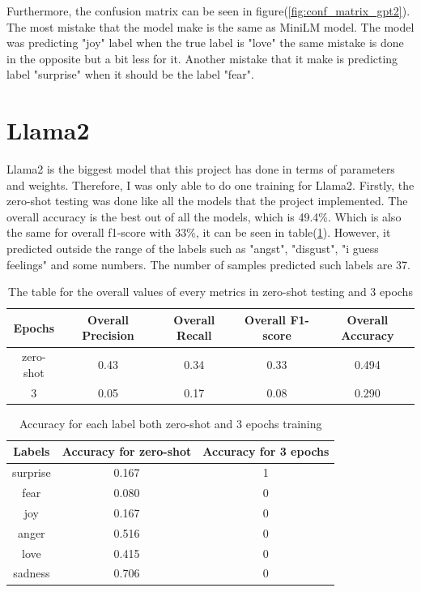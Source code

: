 Furthermore, the confusion matrix can be seen in figure(\ref{fig:conf_matrix_gpt2}). The most mistake that the model make is the same as MiniLM model. The model was predicting "joy" label when the true label is "love" the same mistake is done in the opposite but a bit less for it. Another mistake that it make is predicting label "surprise" when it should be the label "fear". 

\section{Llama2}

Llama2 is the biggest model that this project has done in terms of parameters and weights. Therefore, I was only able to do one training for Llama2. Firstly, the zero-shot testing was done like all the models that the project implemented. The overall accuracy is the best out of all the models, which is 49.4\%. Which is also the same for overall f1-score with 33\%, it can be seen in table(\ref{tab:overall_metrics_llama2}). However, it predicted outside the range of the labels such as "angst", "disgust", "i guess feelings" and some numbers. The number of samples predicted such labels are 37.

\begin{table}[h!]
    \centering
    \begin{tabular}{|c|c|c|c|c|}\hline
          Epochs  & Overall Precision & Overall Recall & Overall F1-score & Overall Accuracy\\\hline
           zero-shot & 0.43 & 0.34 & 0.33 & 0.494\\\hline
           3 & 0.05 & 0.17 & 0.08 & 0.290\\\hline
    \end{tabular}
    \caption{The table for the overall values of every metrics in zero-shot testing and 3 epochs}
    \label{tab:overall_metrics_llama2}
\end{table}

\begin{table}[h!]
    \centering
    \begin{tabular}{c|c|c}
       Labels  & Accuracy for zero-shot & Accuracy for 3 epochs\\\hline
        surprise & 0.167 & 1\\
        fear & 0.080 &  0\\
        joy & 0.167 & 0 \\
        anger & 0.516 &  0\\
        love & 0.415 & 0 \\
        sadness & 0.706 &  0\\
    \end{tabular}
    \caption{Accuracy for each label both zero-shot and 3 epochs training}
    \label{tab:acc_each_labels_llama2}
\end{table}

